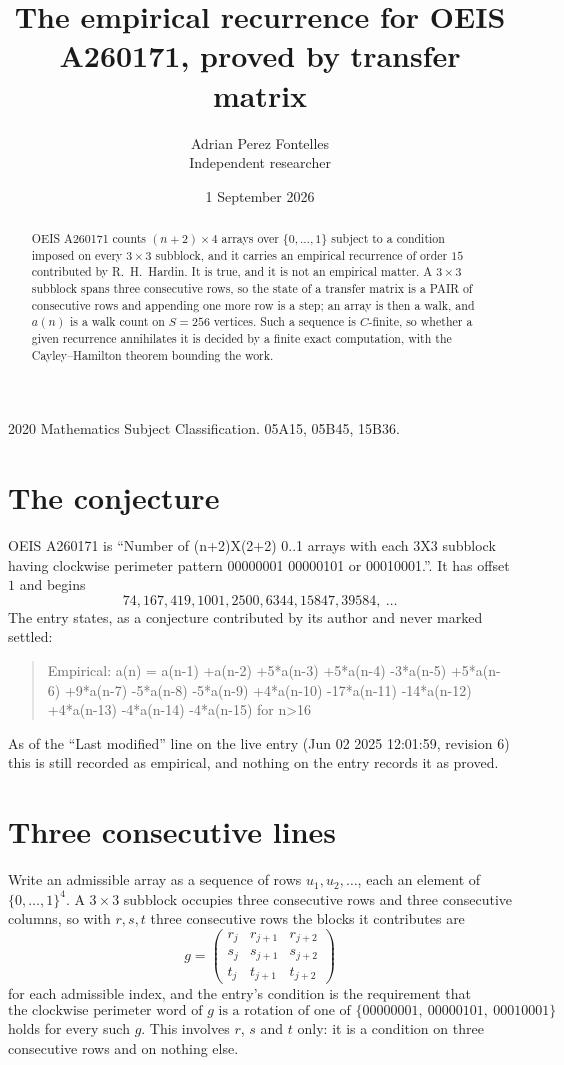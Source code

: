 \documentclass[11pt,a4paper]{article}
\title{The empirical recurrence for OEIS A260171, proved by transfer matrix}
\author{Adrian Perez Fontelles\\ \small Independent researcher}
\date{1 September 2026}
\theoremstyle{plain}
\theoremstyle{definition}
\begin{document}
\maketitle

\begin{abstract}
OEIS A260171 counts $(n+2)\times4$ arrays over $\{0,\dots,1\}$ subject to a condition imposed on
every $3\times3$ subblock, and it carries an empirical recurrence of order $15$
contributed by R.~H.~Hardin. It is true, and it is not an empirical matter. A $3\times3$
subblock spans three consecutive rows, so the state of a transfer matrix is a PAIR of
consecutive rows and appending one more row is a step; an array is then a walk, and
$a(n)$ is a walk count on $S=256$ vertices. Such a sequence is $C$-finite, so whether a given
recurrence annihilates it is decided by a finite exact computation, with the Cayley--Hamilton
theorem bounding the work.
\end{abstract}

\noindent\small 2020 Mathematics Subject Classification. 05A15, 05B45, 15B36.\normalsize

\section{The conjecture}

OEIS A260171 is ``Number of (n+2)X(2+2) 0..1 arrays with each 3X3 subblock having clockwise perimeter pattern 00000001 00000101 or 00010001.''. It has offset $1$ and begins
\[
74, 167, 419, 1001, 2500, 6344, 15847, 39584,\ \dots
\]
The entry states, as a conjecture contributed by its author and never marked settled:
\begin{quote}
Empirical: a(n) = a(n-1) +a(n-2) +5*a(n-3) +5*a(n-4) -3*a(n-5) +5*a(n-6) +9*a(n-7) -5*a(n-8) -5*a(n-9) +4*a(n-10) -17*a(n-11) -14*a(n-12) +4*a(n-13) -4*a(n-14) -4*a(n-15) for n>16
\end{quote}
As of the ``Last modified'' line on the live entry (Jun 02 2025 12:01:59, revision 6) this is still
recorded as empirical, and nothing on the entry records it as proved.

\section{Three consecutive lines}

Write an admissible array as a sequence of rows $u_1,u_2,\dots$, each an element of
$\{0,\dots,1\}^{4}$. A $3\times3$ subblock occupies three consecutive rows and
three consecutive columns, so with $r,s,t$ three consecutive rows the blocks it
contributes are
\[
g=\begin{pmatrix}r_j&r_{j+1}&r_{j+2}\\ s_j&s_{j+1}&s_{j+2}\\ t_j&t_{j+1}&t_{j+2}\end{pmatrix}
\]
for each admissible index, and the entry's condition is the requirement that
\[
\text{the clockwise perimeter word of }g\text{ is a rotation of one of }\{00000001,\ 00000101,\ 00010001\}
\]
holds for every such $g$. This involves $r$, $s$ and $t$ only: it is a condition on
three consecutive rows and on nothing else.
\end{document}
